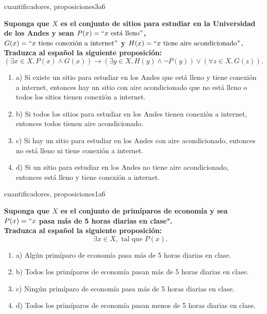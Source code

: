 \documentclass{article}
\begin{document}
\begin{question}{35}{cuantificadores, proposiciones}{3}{a}{6}{
\textbf{Suponga que $X$ es el conjunto de sitios para estudiar en la Universidad de los Andes y sean $P(x)=``x\text{ está lleno}"$, $G(x)=``x\text{ tiene conexión a internet}"$ y $H(x)=``x\text{ tiene aire acondicionado}"$.}\\

\textbf{Traduzca al español la siguiente proposición:}
\[
(\exists x \in X, P(x) \land G(x)) \rightarrow (\exists y \in X, H(y) \land \neg P(y)) \lor (\forall z \in X, G(z)).
\]

\begin{enumerate}
    \item a) Si existe un sitio para estudiar en los Andes que está lleno y tiene conexión a internet, entonces hay un sitio con aire acondicionado que no está lleno o todos los sitios tienen conexión a internet.
    \item b) Si todos los sitios para estudiar en los Andes tienen conexión a internet, entonces todos tienen aire acondicionado.
    \item c) Si hay un sitio para estudiar en los Andes con aire acondicionado, entonces no está lleno ni tiene conexión a internet.
    \item d) Si un sitio para estudiar en los Andes no tiene aire acondicionado, entonces está lleno y tiene conexión a internet.
\end{enumerate}
}
\end{question}

\begin{question}{36}{cuantificadores, proposiciones}{1}{a}{6}{
\textbf{Suponga que $X$ es el conjunto de primíparos de economía y sea $P(x)=``x$ pasa más de 5 horas diarias en clase".}\\

\textbf{Traduzca al español la siguiente proposición:}
\[
\exists x \in X, \text{ tal que } P(x).
\]

\begin{enumerate}
    \item a) Algún primíparo de economía pasa más de 5 horas diarias en clase.
    \item b) Todos los primíparos de economía pasan más de 5 horas diarias en clase.
    \item c) Ningún primíparo de economía pasa más de 5 horas diarias en clase.
    \item d) Todos los primíparos de economía pasan menos de 5 horas diarias en clase.
\end{enumerate}
}
\end{question}
\end{document}
